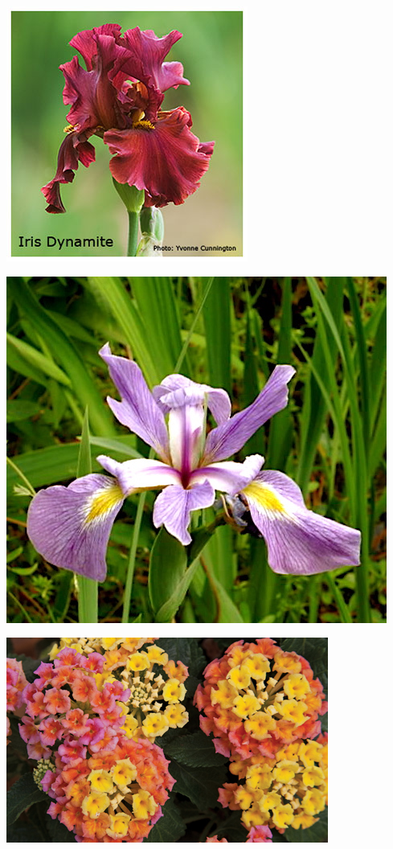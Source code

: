 \documentclass{article}
\begin{document}
\begin{center}
\includegraphics[width=0.9\textheight, angle=90]{../Iris_Dynamite.jpg}
\end{center}
\newpage

\begin{center}
\includegraphics[width=0.9\textheight, angle=90]{../Iris_RiverIris.jpg}
\end{center}
\newpage

\begin{center}
\includegraphics[width=0.9\textheight, angle=90]{../Lantana.jpg}
\end{center}
\newpage
\end{document}
